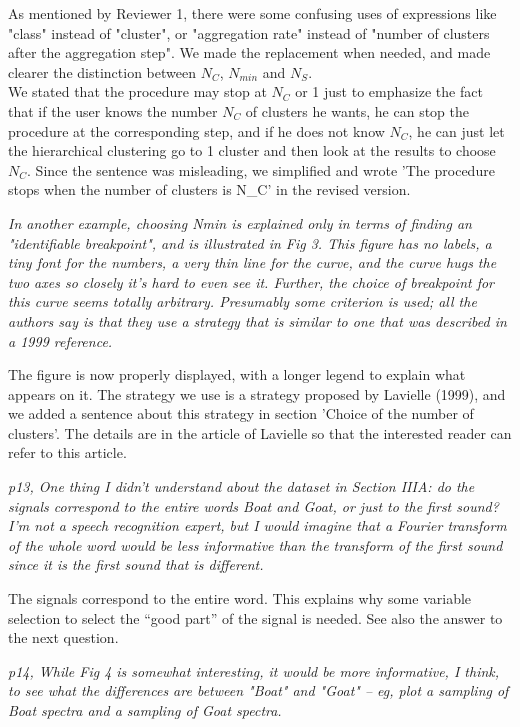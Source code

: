 \documentclass[a4paper,11pt]{article}
\begin{document}
As mentioned by Reviewer 1, there were some confusing uses of expressions like "class" instead of "cluster", or "aggregation rate" instead of "number of clusters after the aggregation step". We made the replacement when needed, and made clearer the distinction between $N_C$, $N_{min}$ and $N_S$.\\
We stated that the procedure may stop at $N_C$ or 1 just to emphasize the fact that if the user knows the number $N_C$ of clusters he wants, he can stop the procedure at the corresponding step, and if he does not know $N_C$, he can just let the hierarchical clustering go to 1 cluster and then look at the results to choose $N_C$. Since the sentence was misleading, we simplified and wrote 'The procedure stops when the number of clusters is N_C' in the revised version.

\emph{In another example, choosing Nmin is explained only in terms of finding an "identifiable breakpoint", and is illustrated in Fig 3. This figure has no labels, a tiny font for the numbers, a very thin line for the curve, and the curve hugs the two axes so closely it's hard to even see it.  Further, the choice of breakpoint for this curve seems totally arbitrary.  Presumably some criterion is used; all the authors say is that they use a strategy that is similar to one that was described in a 1999 reference.
}

The figure is now properly displayed, with a longer legend to explain what appears on it. The strategy we use is a strategy proposed by Lavielle (1999), and we added a sentence about this strategy in section 'Choice of the number of clusters'. The details are in the article of Lavielle so that the interested reader can refer to this article.

\emph{p13, One thing I didn't understand about the dataset in Section IIIA: do the signals correspond to the entire words Boat and Goat, or just to the first sound? I'm not a speech recognition expert, but I would imagine that a Fourier transform of the whole word would be less informative than the transform of the first sound since it is the first sound that is different.}

The signals correspond to the entire word. This explains why some variable selection to select the ``good part'' of the signal is needed. See also the answer to the next question.

\emph{p14, While Fig 4 is somewhat interesting, it would be more informative, I think, to see what the differences are between "Boat" and "Goat" -- eg, plot a sampling of Boat spectra and a sampling of Goat spectra.}
\end{document}
